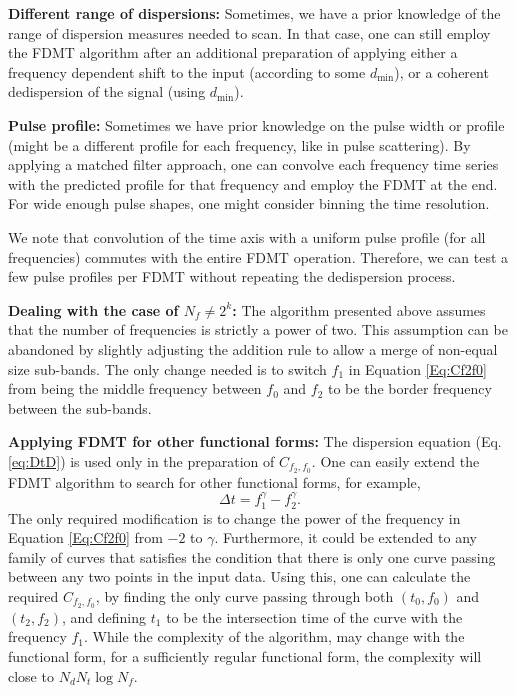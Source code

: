 \documentclass[iop]{emulateapj}
\begin{document}
{\bf Different range of dispersions:}
Sometimes, we have a prior knowledge of the range of dispersion measures needed to scan. In that case, one can still employ the FDMT algorithm after an additional preparation of applying either a frequency dependent shift to the input (according to some $d_{\min}$), or a coherent dedispersion of the signal (using $d_{\min}$).

{\bf Pulse profile:}\label{subsubsec:PulseProfile}
Sometimes we have prior knowledge on the pulse width or profile (might be a different profile for each frequency, like in pulse scattering).
By applying a matched filter approach, one can convolve each frequency time series with the predicted profile for that frequency and employ the FDMT at the end. For wide enough pulse shapes, one might consider binning the time resolution.

We note that convolution of the time axis with a uniform pulse profile (for all frequencies) commutes with the entire FDMT operation.
Therefore, we can test a few pulse profiles per FDMT without repeating the dedispersion process.
 
{\bf Dealing with the case of $N_f\neq 2^k$:}
The algorithm presented above assumes that the number of frequencies is strictly a power of two. This assumption can be abandoned by slightly adjusting the addition rule to allow a merge of non-equal size sub-bands. The only change needed is to switch $f_1$ in Equation \ref{Eq:Cf2f0} from being the middle frequency between $f_0$ and $f_2$ to be the border frequency between the sub-bands.

{\bf Applying FDMT for other functional forms:}
The dispersion equation (Eq. \ref{eq:DtD}) is used only in the preparation of $C_{f_2,f_0}$. One can easily extend the FDMT algorithm to search for other functional forms, for example, \begin{equation}\Delta t = f_1^{\gamma} - f_2^{\gamma}.\end{equation}
The only required modification is to change the power of the frequency in Equation \ref{Eq:Cf2f0} from $-2$ to $\gamma$.
Furthermore, it could be extended to any family of curves that satisfies the condition that there is only one curve passing between any two points in the input data. Using this, one can calculate the required $C_{f_2,f_0}$, by finding the only curve passing through both $(t_0,f_0)$ and $(t_2,f_2)$, and defining $t_1$ to be the intersection time of the curve with the frequency $f_1$.
While the complexity of the algorithm, may change with the functional form, for a sufficiently regular functional form, the complexity will close to $N_dN_t\log{N_f}.$
\end{document}
